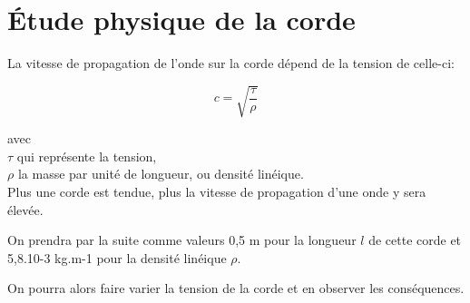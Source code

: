 \section{Étude physique de la corde}

La vitesse de propagation de l'onde sur la corde dépend de la tension de celle-ci:

\begin{equation*}
c = \sqrt{\frac{\tau}{\rho}}
\end{equation*}

avec \\
\hspace*{2cm} $\tau$ qui représente la tension, \\
\hspace*{2cm} $\rho$ la masse par unité de longueur, ou densité linéique.\\

Plus une corde est tendue, plus la vitesse de propagation d’une onde y sera élevée.\

On prendra par la suite comme valeurs 0,5 m pour la longueur $l$ de cette corde et 5,8.10-3 kg.m-1 pour la densité linéique $\rho$.\

On pourra alors faire varier la tension de la corde et en observer les conséquences.


